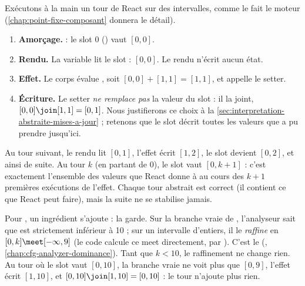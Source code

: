 Exécutons \og à la main\fg{} un tour de React sur des intervalles, comme le
fait le moteur (\cref{chap:point-fixe-composant} donnera le détail).
\begin{enumerate}
  \item \textbf{Amorçage.}  : le slot 0 () vaut
    $[0,0]$.
  \item \textbf{Rendu.} La variable  lit le slot : $[0,0]$. Le
    rendu n'écrit aucun état.
  \item \textbf{Effet.} Le corps évalue , soit
    $[0,0] + [1,1] = [1,1]$, et appelle le setter.
  \item \textbf{Écriture.} Le setter \emph{ne remplace pas} la valeur du slot :
    il la joint, $[0,0] \join [1,1] = [0,1]$. Nous justifierons ce choix à la
    \cref{sec:interpretation-abstraite-mises-a-jour} ; retenons que le slot
    décrit toutes les valeurs que  a pu prendre jusqu'ici.
\end{enumerate}
Au tour suivant, le rendu lit $[0,1]$, l'effet écrit $[1,2]$, le slot devient
$[0,2]$, et ainsi de suite. Au tour $k$ (en partant de 0), le slot vaut
$[0, k+1]$ : c'est exactement l'ensemble des valeurs que React donne à
 au cours des $k+1$ premières exécutions de l'effet. Chaque tour
abstrait est correct (il contient ce que React peut faire), mais la suite ne
se stabilise jamais.

Pour , un ingrédient s'ajoute : la garde. Sur la branche
\og vraie\fg{} de , l'analyseur sait que  est
strictement inférieur à 10 ; sur un intervalle d'entiers, il le
\emph{raffine} en $[0,k] \meet [-\infty, 9]$ (le code calcule ce meet
directement, par ). C'est le  (, \cref{chap:cfg-analyzer-dominance}). Tant
que $k < 10$, le raffinement ne change rien. Au tour où le slot vaut
$[0,10]$, la branche vraie ne voit plus que $[0,9]$, l'effet écrit $[1,10]$, et
$[0,10] \join [1,10] = [0,10]$ : le tour n'ajoute plus rien.

